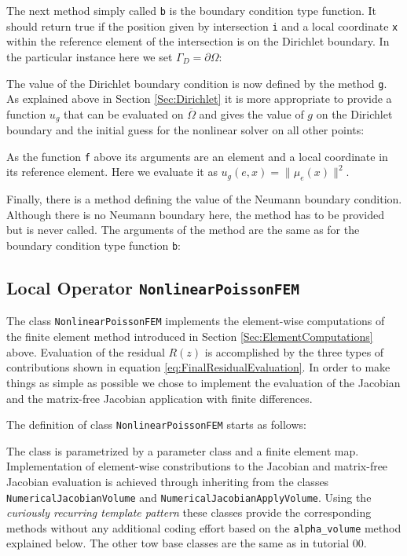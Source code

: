\documentclass[a4paper,12pt]{article}
\begin{document}
The next method simply called \lstinline{b} is the boundary condition
type function. It should return true if the position given
by intersection \lstinline{i} and a local coordinate \lstinline{x} within
the reference element of the intersection is on the Dirichlet boundary.
In the particular instance here we set $\Gamma_D=\partial\Omega$:


The value of the Dirichlet boundary condition is now defined by the
method \lstinline{g}. As explained above in Section \ref{Sec:Dirichlet} it
is more appropriate to provide a function $u_g$ that can be evaluated
on $\overline{\Omega}$ and gives the value of $g$ on the Dirichlet boundary
and the initial guess for the nonlinear solver on all other points:

As the function \lstinline{f} above its arguments are an element and a local coordinate
in its reference element. Here we evaluate it as $u_g(e,x) = \|\mu_e(x)\|^2$.

Finally, there is a method defining the value of the Neumann boundary condition.
Although there is no Neumann boundary here, the method has to be provided but is
never called. The arguments of the method are the same as for the boundary
condition type function \lstinline{b}:



\subsection{Local Operator \lstinline{NonlinearPoissonFEM}}

The class \lstinline{NonlinearPoissonFEM} implements the
element-wise computations of the finite element method
introduced in Section \ref{Sec:ElementComputations} above.
Evaluation of the residual $R(z)$ is accomplished
by the three types of contributions shown in equation \eqref{eq:FinalResidualEvaluation}.
In order to make things as simple as possible we chose to implement
the evaluation of the Jacobian and the matrix-free Jacobian application
with finite differences.

The definition of class \lstinline{NonlinearPoissonFEM} starts as follows:

The class is parametrized by a parameter class and a finite element map.
Implementation of element-wise constributions to the Jacobian and matrix-free
Jacobian evaluation is achieved through inheriting from the
classes \lstinline{NumericalJacobianVolume} and \lstinline{NumericalJacobianApplyVolume}.
Using the \textit{curiously recurring template pattern} these classes provide
the corresponding methods without any additional coding effort
based on the \lstinline{alpha_volume} method explained below.
The other tow base classes are the same as in tutorial 00.
\end{document}
